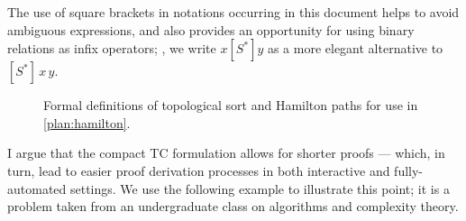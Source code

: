 The use of square brackets in notations occurring in this document helps to avoid ambiguous expressions, and also provides an opportunity for using binary relations as infix operators;
\eg, we write $x[S^*]y$ as a more elegant alternative to $[S^*]\,x\,y$.

\begin{figure}
\centering

\caption{Formal definitions of topological sort and Hamilton paths
  for use in \autoref{plan:hamilton}.}
\label{plan:hamilton-defs}
\end{figure}

I argue that the compact TC formulation allows for shorter proofs --- which, in turn, lead to easier proof derivation processes in both interactive and fully-automated settings.
We use the following example to illustrate this point; it is a problem taken from an undergraduate class on algorithms and complexity theory.

